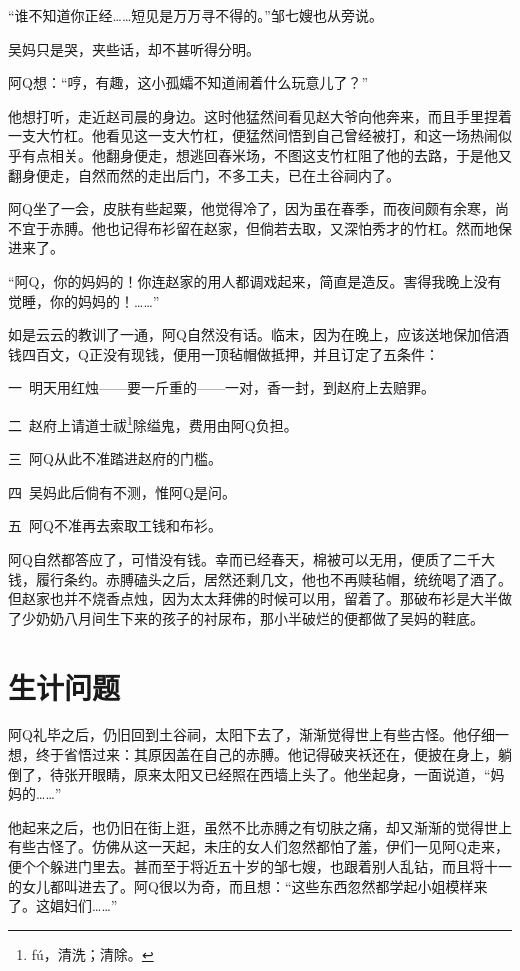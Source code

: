 \documentclass[12pt,UTF8]{ctexbook}
\begin{document}
“谁不知道你正经……短见是万万寻不得的。”邹七嫂也从旁说。

吴妈只是哭，夹些话，却不甚听得分明。

阿Q想：“哼，有趣，这小孤孀不知道闹着什么玩意儿了？”

他想打听，走近赵司晨的身边。这时他猛然间看见赵大爷向他奔来，而且手里捏着一支大竹杠。他看见这一支大竹杠，便猛然间悟到自己曾经被打，和这一场热闹似乎有点相关。他翻身便走，想逃回舂米场，不图这支竹杠阻了他的去路，于是他又翻身便走，自然而然的走出后门，不多工夫，已在土谷祠内了。

阿Q坐了一会，皮肤有些起粟，他觉得冷了，因为虽在春季，而夜间颇有余寒，尚不宜于赤膊。他也记得布衫留在赵家，但倘若去取，又深怕秀才的竹杠。然而地保进来了。

“阿Q，你的妈妈的！你连赵家的用人都调戏起来，简直是造反。害得我晚上没有觉睡，你的妈妈的！……”

如是云云的教训了一通，阿Q自然没有话。临末，因为在晚上，应该送地保加倍酒钱四百文，Q正没有现钱，便用一顶毡帽做抵押，并且订定了五条件：

一\ 明天用红烛——要一斤重的——一对，香一封，到赵府上去赔罪。

二\ 赵府上请道士祓\footnote{f\'u，清洗；清除。}除缢鬼，费用由阿Q负担。

三\ 阿Q从此不准踏进赵府的门槛。

四\ 吴妈此后倘有不测，惟阿Q是问。

五\ 阿Q不准再去索取工钱和布衫。

阿Q自然都答应了，可惜没有钱。幸而已经春天，棉被可以无用，便质了二千大钱，履行条约。赤膊磕头之后，居然还剩几文，他也不再赎毡帽，统统喝了酒了。但赵家也并不烧香点烛，因为太太拜佛的时候可以用，留着了。那破布衫是大半做了少奶奶八月间生下来的孩子的衬尿布，那小半破烂的便都做了吴妈的鞋底。

\chapter{生计问题}

阿Q礼毕之后，仍旧回到土谷祠，太阳下去了，渐渐觉得世上有些古怪。他仔细一想，终于省悟过来：其原因盖在自己的赤膊。他记得破夹袄还在，便披在身上，躺倒了，待张开眼睛，原来太阳又已经照在西墙上头了。他坐起身，一面说道，“妈妈的……”

他起来之后，也仍旧在街上逛，虽然不比赤膊之有切肤之痛，却又渐渐的觉得世上有些古怪了。仿佛从这一天起，未庄的女人们忽然都怕了羞，伊们一见阿Q走来，便个个躲进门里去。甚而至于将近五十岁的邹七嫂，也跟着别人乱钻，而且将十一的女儿都叫进去了。阿Q很以为奇，而且想：“这些东西忽然都学起小姐模样来了。这娼妇们……”
\end{document}
